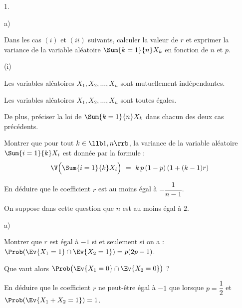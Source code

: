 \documentclass[11pt]{article}%
\begin{document}
\begin{noliste}{1.}
  \setlength{\itemsep}{4mm}
  \item
  \begin{noliste}{a)}
    \setlength{\itemsep}{2mm}
    \item Dans les cas $(i)$ et $(ii)$ suivants, calculer la valeur 
    de $r$ et exprimer la variance de la variable aléatoire $ 
    \Sum{k=1}{n} X_k$ en fonction de $n$ et $p$.
    \begin{nonoliste}{(i)}
      \item Les variables aléatoires $X_1, X_2, \ldots, X_n$ sont 
      mutuellement indépendantes.
      
      \item Les variables aléatoires $X_1, X_2, \ldots, X_n$ sont 
      toutes égales.
    \end{nonoliste}
    
    De plus, préciser la loi de $\Sum{k=1}{n} X_k$ dans chacun 
    des deux cas précédents.
    
    



    
  \item Montrer que pour tout $k \in \llb 1,n \rrb$, la variance de la
    variable aléatoire $\Sum{i=1}{k} X_i$ est donnée par la formule :
    \[
    \V \Big(\Sum{i=1}{k} X_i\Big) \ = \ k \, p \, (1-p) \, (1+(k-1)r)
    \]
    
    
    
  \item En déduire que le coefficient $r$ est au moins égal à
    $-\dfrac{1}{n-1}$.

    
  \end{noliste}
  
  
  
  
\item On suppose dans cette question que $n$ est au moins égal à $2$.
  \begin{noliste}{a)}
    \setlength{\itemsep}{2mm}
  \item Montrer que $r$ est égal à $-1$ si et seulement si on a :
    $\Prob (\Ev{X_1=1} \cap \Ev{X_2=1}) = p(2p-1)$.
    
    

  \item Que vaut alors $\Prob\big(\Ev{X_1=0} \cap \Ev{X_2=0} \big)$ ?

    
    
  \item En déduire que le coefficient $r$ ne peut-être égal à $-1$ que
    lorsque $p = \dfrac{1}{2}$ et $\Prob(\Ev{X_1 + X_2 = 1}) = 1$.


\end{noliste}
\end{noliste}
\end{document}
